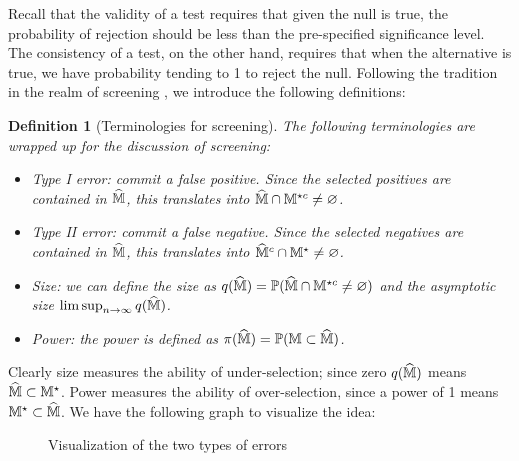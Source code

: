 \documentclass[12pt]{article}
\newtheorem{definition}{Definition}
\begin{document}
Recall that the validity of a test requires that given the null is true, the probability of rejection should be less than the pre-specified significance level. The consistency of a test, on the other hand, requires that when the alternative is true, we have probability tending to 1 to reject the null.  Following the tradition in the realm of  screening \citep{wasserman2009high}, we introduce the following definitions:
\begin{definition}[Terminologies for  screening]
The following terminologies are wrapped up for the discussion of  screening:
\begin{itemize}
    \item Type I error:  commit a false positive. Since the selected positives are contained in $\widehat{{\mathbb{M}}}$, this translates into $\widehat{{\mathbb{M}}}\cap{\mathbb{M}}^{\star c}\neq \varnothing$. 
    \item Type II error:  commit a false negative. Since the selected negatives are contained in $\widehat{{\mathbb{M}}}$, this translates into $\widehat{{\mathbb{M}}}^c\cap{\mathbb{M}}^{\star}\neq \varnothing$. 
    
    \item Size: we can define the size as $q(\widehat{{\mathbb{M}}}) = {\mathbb{P}}(\widehat{{\mathbb{M}}}\cap {\mathbb{M}}^{\star c} \neq \varnothing)$ and the asymptotic size $\lim \sup_{n\to\infty} q(\widehat{{\mathbb{M}}})$.
    
    \item Power: the power is defined as  $\pi(\widehat{{\mathbb{M}}}) = {\mathbb{P}}({\mathbb{M}} \subset \widehat{{\mathbb{M}}})$.
\end{itemize}
\end{definition}

Clearly size measures the ability of under-selection; since zero $q(\widehat{{\mathbb{M}}})$ means $\widehat{{\mathbb{M}}}\subset {\mathbb{M}}^\star$. Power measures the ability of over-selection, since a power of 1 means ${\mathbb{M}}^\star\subset\widehat{{\mathbb{M}}}$. We have the following graph to visualize the idea:



\begin{figure}[th]
\centering


\caption{Visualization of the two types of errors}

\end{figure}
\end{document}

